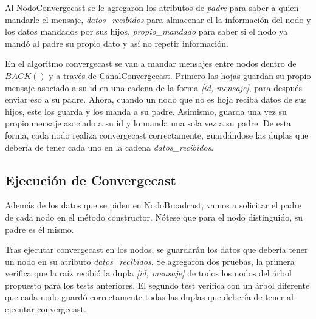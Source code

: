 Al NodoConvergecast se le agregaron los atributos de \textit{padre} para saber a quien mandarle el mensaje, \textit{datos\_recibidos} para almacenar el la información del nodo y los datos mandados por sus hijos, \textit{propio\_mandado} para saber si el nodo ya mandó al padre su propio dato y así no repetir información.

En el algoritmo convergecast se van a mandar mensajes entre nodos dentro de $BACK()$ y a través de CanalConvergecast. Primero las hojas guardan su propio mensaje asociado a su id en una cadena de la forma \textit{[id, mensaje]}, para después enviar eso a su padre. Ahora, cuando un nodo que no es hoja reciba datos de sus hijos, este los guarda y los manda a su padre. Asimismo, guarda una vez su propio mensaje asociado a su id y lo manda una sola vez a su padre. De esta forma, cada nodo realiza convergecast correctamente, guardándose las duplas que debería de tener cada uno en la cadena \textit{datos\_recibidos}.

\subsection*{Ejecución de Convergecast}

Además de los datos que se piden en NodoBroadcast, vamos a solicitar el padre de cada nodo en el método constructor. Nótese que para el nodo distinguido, su padre es él mismo.

Tras ejecutar convergecast en los nodos, 
se guardarán los datos que debería tener un nodo en su atributo \textit{datos\_recibidos}. 
Se agregaron dos pruebas, la primera verifica que la raíz recibió la dupla \textit{[id, mensaje]} de todos los nodos del árbol propuesto para los tests anteriores. El segundo test verifica con un árbol diferente que cada nodo guardó correctamente todas las duplas que debería de tener al ejecutar convergecast.
